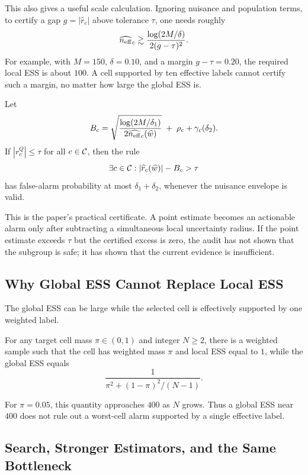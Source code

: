 This also gives a useful scale calculation. Ignoring nuisance and population terms, to certify a gap \(g=|\widehat r_c|\) above tolerance \(\tau\), one needs roughly
\[
\widehat{n_{\mathrm{eff}}}_c
\gtrsim
\frac{\log(2M/\delta)}{2(g-\tau)^2}.
\]
For example, with \(M=150\), \(\delta=0.10\), and a margin \(g-\tau=0.20\), the required local ESS is about \(100\). A cell supported by ten effective labels cannot certify such a margin, no matter how large the global ESS is.

\begin{corollary}\label{cor:certified-alarm}
Let
\[
B_c
=
\sqrt{\frac{\log(2M/\delta_1)}{2\widehat{n_{\mathrm{eff}}}_c(\widehat w)}}
\;+\;\rho_c+\gamma_c(\delta_2).
\]
If \(|r_c^Q|\le \tau\) for all \(c\in\mathcal{C}\), then the rule
\[
\exists c\in\mathcal{C}:
|\widehat r_c(\widehat w)|-B_c>\tau
\]
has false-alarm probability at most \(\delta_1+\delta_2\), whenever the nuisance envelope is valid.
\end{corollary}

This is the paper's practical certificate. A point estimate becomes an actionable alarm only after subtracting a simultaneous local uncertainty radius. If the point estimate exceeds \(\tau\) but the certified excess is zero, the audit has not shown that the subgroup is safe; it has shown that the current evidence is insufficient.

\subsection{Why Global ESS Cannot Replace Local ESS}

The global ESS can be large while the selected cell is effectively supported by one weighted label.

\begin{proposition}\label{prop:global-misleading}
For any target cell mass \(\pi\in(0,1)\) and integer \(N\ge2\), there is a weighted sample such that the cell has weighted mass \(\pi\) and local ESS equal to \(1\), while the global ESS equals
\[
\frac{1}{\pi^2+(1-\pi)^2/(N-1)}.
\]
\end{proposition}

For \(\pi=0.05\), this quantity approaches \(400\) as \(N\) grows. Thus a global ESS near \(400\) does not rule out a worst-cell alarm supported by a single effective label.

\subsection{Search, Stronger Estimators, and the Same Bottleneck}

